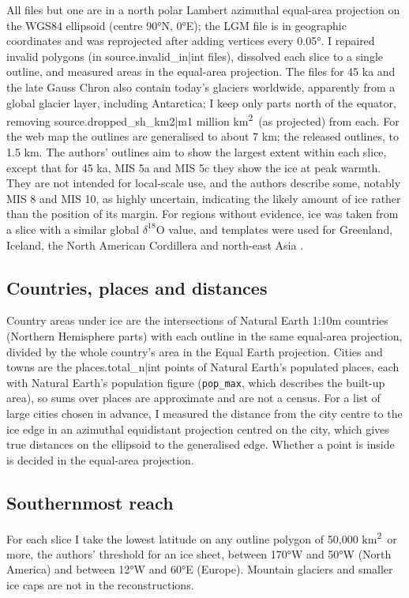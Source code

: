 \documentclass[11pt,a4paper]{article}
\newcommand{\kmq}{km\textsuperscript{2}}
\begin{document}
All files but one are in a north polar Lambert azimuthal equal-area projection on the WGS84 ellipsoid (centre 90°N, 0°E); the LGM file is in geographic coordinates and was reprojected after adding vertices every 0.05°. I repaired invalid polygons (in {{source.invalid_in|int}} files), dissolved each slice to a single outline, and measured areas in the equal-area projection. The files for 45 ka and the late Gauss Chron also contain today's glaciers worldwide, apparently from a global glacier layer, including Antarctica; I keep only parts north of the equator, removing {{source.dropped_sh_km2|m1}} million \kmq\ (as projected) from each. For the web map the outlines are generalised to about 7 km; the released outlines, to 1.5 km. The authors' outlines aim to show the largest extent within each slice, except that for 45 ka, MIS 5a and MIS 5c they show the ice at peak warmth. They are not intended for local-scale use, and the authors describe some, notably MIS 8 and MIS 10, as highly uncertain, indicating the likely amount of ice rather than the position of its margin. For regions without evidence, ice was taken from a slice with a similar global $\delta^{18}$O value, and templates were used for Greenland, Iceland, the North American Cordillera and north-east Asia \citep{batchelor}.

\subsection{Countries, places and distances}
Country areas under ice are the intersections of Natural Earth 1:10m countries (Northern Hemisphere parts) with each outline in the same equal-area projection, divided by the whole country's area in the Equal Earth projection. Cities and towns are the {{places.total_n|int}} points of Natural Earth's populated places, each with Natural Earth's population figure (\texttt{pop\_max}, which describes the built-up area), so sums over places are approximate and are not a census. For a list of large cities chosen in advance, I measured the distance from the city centre to the ice edge in an azimuthal equidistant projection centred on the city, which gives true distances on the ellipsoid to the generalised edge. Whether a point is inside is decided in the equal-area projection.

\subsection{Southernmost reach}
For each slice I take the lowest latitude on any outline polygon of 50,000 \kmq\ or more, the authors' threshold for an ice sheet, between 170°W and 50°W (North America) and between 12°W and 60°E (Europe). Mountain glaciers and smaller ice caps are not in the reconstructions.
\end{document}
